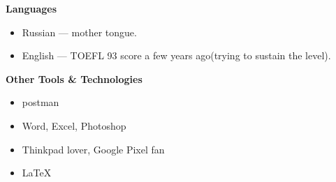 \documentclass[11pt]{article}
\newcommand\CvBigSkipLength{1em}
\newcommand\CvSkip[1]{\vspace{#1}}
\newcommand\CvBigSkip{\CvSkip{\CvBigSkipLength}}
\newcommand\CvSectionHeader[1]{\CvBigSkip\textbf{#1}\CvBigSkip}
\begin{document}
\begin{minipage}[t]{.5\linewidth}
  \CvSectionHeader{Languages}

  \begin{itemize}
    \item Russian --- mother tongue.
    \item English --- TOEFL 93 score a few years ago(trying to sustain the level).
  \end{itemize}

  \CvSectionHeader{Other Tools \& Technologies}

  \begin{itemize}
    \item postman
   \item Word, Excel, Photoshop
    \item Thinkpad lover, Google Pixel fan
    \item \LaTeX
  \end{itemize}
\end{minipage}
\end{document}
